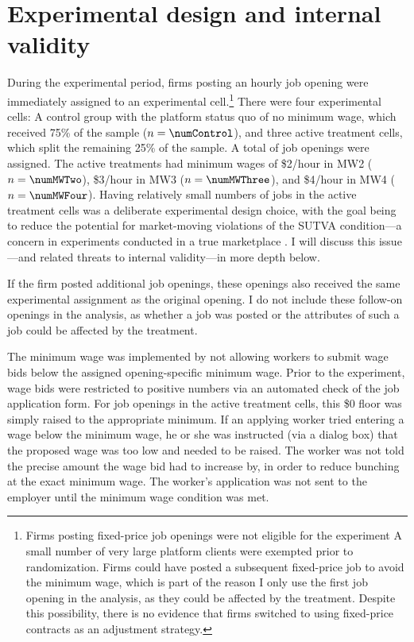 \documentclass[AER]{AEA}
\begin{document}
\section{Experimental design and internal validity}  \label{sec:ed}

During the experimental period, firms posting an hourly job opening were immediately assigned to an experimental cell.\footnote{
  Firms posting fixed-price job openings were not eligible for the experiment
  A small number of very large platform clients were exempted prior to randomization. 
  Firms could have posted a subsequent fixed-price job to avoid the minimum wage, which is part of the reason I only use the first job opening in the analysis, as they could be affected by the treatment. 
  Despite this possibility, there is no evidence that firms switched to using fixed-price contracts as an adjustment strategy. 
}
There were four experimental cells: 
A control group with the platform status quo of no minimum wage, which received 75\% of the sample ($n=\numControl$), and three active treatment cells, which split the remaining 25\% of the sample. 
A total of \numTotal{} job openings were assigned.
The active treatments had minimum wages of \$2/hour in MW2 ($n=\numMWTwo$), \$3/hour in MW3 ($n=\numMWThree$), and \$4/hour in MW4 ($n=\numMWFour$). 
Having relatively small numbers of jobs in the active treatment cells was a deliberate experimental design choice, with the goal being to reduce the potential for market-moving violations of the SUTVA condition---a concern in experiments conducted in a true marketplace \citep{blake2014marketplace}. 
I will discuss this issue---and related threats to internal validity---in more depth below.


If the firm posted additional job openings, these openings also received the same experimental assignment as the original opening.
I do not include these follow-on openings in the analysis, as whether a job was posted or the attributes of such a job could be affected by the treatment. 


The minimum wage was implemented by not allowing workers to submit wage bids below the assigned opening-specific minimum wage.
Prior to the experiment, wage bids were restricted to positive numbers via an automated check of the job application form. 
For job openings in the active treatment cells, this \$0 floor was simply raised to the appropriate minimum.  
If an applying worker tried entering a wage below the minimum wage, he or she was instructed (via a dialog box) that the proposed wage was too low and needed to be raised.
The worker was not told the precise amount the wage bid had to increase by, in order to reduce bunching at the exact minimum wage.
The worker's application was not sent to the employer until the minimum wage condition was met.
\end{document}
